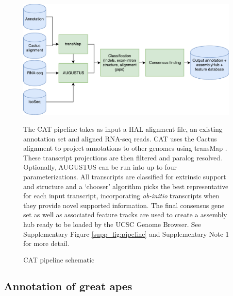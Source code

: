 \documentclass[fleqn,10pt]{wlscirep}
\begin{document}
\begin{figure}
\centering
\includegraphics[width=\textwidth,height=\textheight,keepaspectratio]{pipeline_simplified.pdf}
\caption{CAT pipeline schematic}
The CAT pipeline takes as input a HAL alignment file, an existing annotation set and aligned RNA-seq reads. CAT uses the Cactus alignment to project annotations to other genomes using transMap \cite{stanke2008using}. These transcript projections are then filtered and paralog resolved. Optionally, AUGUSTUS can be run into up to four parameterizations. All transcripts are classified for extrinsic support and structure and a ‘chooser’ algorithm picks the best representative for each input transcript, incorporating \textit{ab-initio} transcripts when they provide novel supported information. The final consensus gene set as well as associated feature tracks are used to create a assembly hub ready to be loaded by the UCSC Genome Browser. See Supplementary Figure \ref{supp_fig:pipeline} and Supplementary Note 1 for more detail.
\label{fig:pipeline}
\end{figure}

\subsection*{Annotation of great apes}
\end{document}
